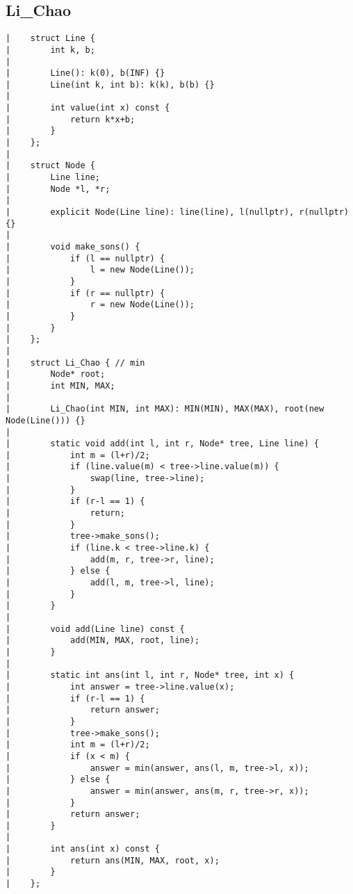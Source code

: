 \documentclass[a4paper, 10pt]{article}
\begin{document}
\begin{center}
\section*{Li\_Chao}
\begin{verbatim}
|    struct Line {
|        int k, b;
|    
|        Line(): k(0), b(INF) {}
|        Line(int k, int b): k(k), b(b) {}
|    
|        int value(int x) const {
|            return k*x+b;
|        }
|    };
|    
|    struct Node {
|        Line line;
|        Node *l, *r;
|    
|        explicit Node(Line line): line(line), l(nullptr), r(nullptr) {}
|    
|        void make_sons() {
|            if (l == nullptr) {
|                l = new Node(Line());
|            }
|            if (r == nullptr) {
|                r = new Node(Line());
|            }
|        }
|    };
|    
|    struct Li_Chao { // min
|        Node* root;
|        int MIN, MAX;
|    
|        Li_Chao(int MIN, int MAX): MIN(MIN), MAX(MAX), root(new Node(Line())) {}
|    
|        static void add(int l, int r, Node* tree, Line line) {
|            int m = (l+r)/2;
|            if (line.value(m) < tree->line.value(m)) {
|                swap(line, tree->line);
|            }
|            if (r-l == 1) {
|                return;
|            }
|            tree->make_sons();
|            if (line.k < tree->line.k) {
|                add(m, r, tree->r, line);
|            } else {
|                add(l, m, tree->l, line);
|            }
|        }
|    
|        void add(Line line) const {
|            add(MIN, MAX, root, line);
|        }
|    
|        static int ans(int l, int r, Node* tree, int x) {
|            int answer = tree->line.value(x);
|            if (r-l == 1) {
|                return answer;
|            }
|            tree->make_sons();
|            int m = (l+r)/2;
|            if (x < m) {
|                answer = min(answer, ans(l, m, tree->l, x));
|            } else {
|                answer = min(answer, ans(m, r, tree->r, x));
|            }
|            return answer;
|        }
|    
|        int ans(int x) const {
|            return ans(MIN, MAX, root, x);
|        }
|    };
\end{verbatim}


\end{center}
\end{document}
